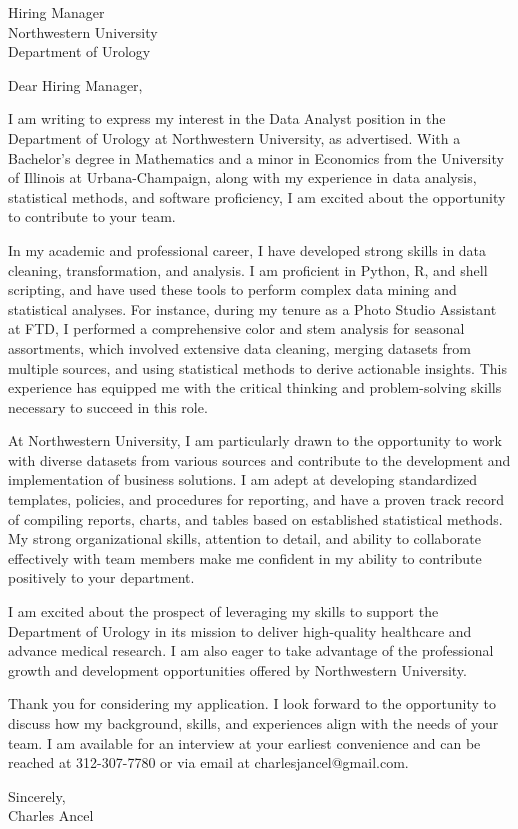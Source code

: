 \documentclass{letter}
\begin{document}
\begin{letter}{Hiring Manager\\Northwestern University\\Department of Urology}

\opening{Dear Hiring Manager,}

I am writing to express my interest in the Data Analyst position in the Department of Urology at Northwestern University, as advertised. With a Bachelor's degree in Mathematics and a minor in Economics from the University of Illinois at Urbana-Champaign, along with my experience in data analysis, statistical methods, and software proficiency, I am excited about the opportunity to contribute to your team.

In my academic and professional career, I have developed strong skills in data cleaning, transformation, and analysis. I am proficient in Python, R, and shell scripting, and have used these tools to perform complex data mining and statistical analyses. For instance, during my tenure as a Photo Studio Assistant at FTD, I performed a comprehensive color and stem analysis for seasonal assortments, which involved extensive data cleaning, merging datasets from multiple sources, and using statistical methods to derive actionable insights. This experience has equipped me with the critical thinking and problem-solving skills necessary to succeed in this role.

At Northwestern University, I am particularly drawn to the opportunity to work with diverse datasets from various sources and contribute to the development and implementation of business solutions. I am adept at developing standardized templates, policies, and procedures for reporting, and have a proven track record of compiling reports, charts, and tables based on established statistical methods. My strong organizational skills, attention to detail, and ability to collaborate effectively with team members make me confident in my ability to contribute positively to your department.

I am excited about the prospect of leveraging my skills to support the Department of Urology in its mission to deliver high-quality healthcare and advance medical research. I am also eager to take advantage of the professional growth and development opportunities offered by Northwestern University.

Thank you for considering my application. I look forward to the opportunity to discuss how my background, skills, and experiences align with the needs of your team. I am available for an interview at your earliest convenience and can be reached at 312-307-7780 or via email at charlesjancel@gmail.com.

\begin{flushleft}
Sincerely,\\
Charles Ancel
\end{flushleft}

\end{letter}
\end{document}
